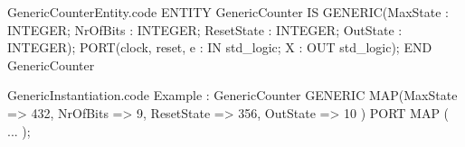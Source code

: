 \documentclass[a4paper]{article}
\begin{document}
\begin{filecontents*}[overwrite]{GenericCounterEntity.code}
ENTITY GenericCounter IS
    GENERIC(MaxState : INTEGER;
            NrOfBits : INTEGER;
            ResetState : INTEGER;
            OutState : INTEGER);
    PORT(clock, reset, e : IN std_logic;
         X : OUT std_logic);
END GenericCounter
\end{filecontents*}

\begin{filecontents*}[overwrite]{GenericInstantiation.code}
Example : GenericCounter
    GENERIC MAP(MaxState => 432,
                NrOfBits => 9,
                ResetState => 356,
                OutState => 10 )
    PORT MAP ( ... );
\end{filecontents*}


\end{document}
